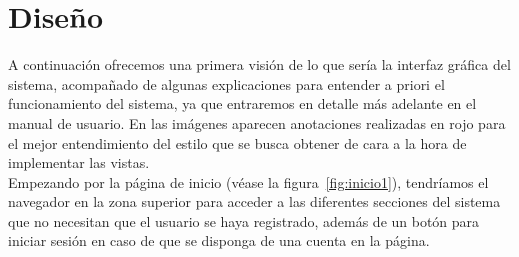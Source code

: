 \clearpage

\section{Dise\~no}

A continuación ofrecemos una primera visión de lo que sería la interfaz gráfica del sistema, acompañado de algunas explicaciones para entender a priori el funcionamiento  del sistema, ya que entraremos en detalle más adelante en el manual de usuario. En las imágenes aparecen anotaciones realizadas en rojo para el mejor entendimiento del estilo que se busca obtener de cara a la hora de implementar las vistas.\\

Empezando por la página de inicio (v\'ease la figura~\ref{fig:inicio1}), tendríamos el navegador en la zona superior para acceder a las diferentes secciones del sistema que no necesitan que el usuario se haya registrado, además de un botón para iniciar sesión en caso de que se disponga de una cuenta en la página.\\

